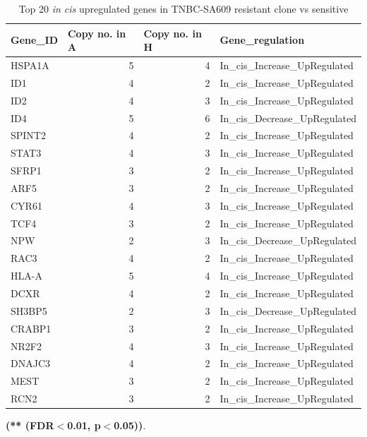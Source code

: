  \begin{table}[htbp]
   \centering
   \caption{Top 20 \textit{in cis} upregulated genes in TNBC-SA609 resistant clone vs sensitive}
     
     \begin{tabular}{|l|r|r|l|}
     \hline
     \textbf{Gene\_ID} & \multicolumn{1}{|l|}{ \textbf{Copy no. in A}}& \multicolumn{1}{|l|}{ \textbf{Copy no. in H}} &  \textbf{Gene\_regulation} \\
     \hline
     HSPA1A & 5 & 4 & In\_cis\_Increase\_UpRegulated \\
     ID1 & 4 & 2 & In\_cis\_Increase\_UpRegulated \\
     ID2 & 4 & 3 & In\_cis\_Increase\_UpRegulated \\
     ID4 & 5 & 6 & In\_cis\_Decrease\_UpRegulated \\
     SPINT2 & 4 & 2 & In\_cis\_Increase\_UpRegulated \\
     STAT3 & 4 & 3 & In\_cis\_Increase\_UpRegulated \\
     SFRP1 & 3 & 2 & In\_cis\_Increase\_UpRegulated \\
     ARF5 & 3 & 2 & In\_cis\_Increase\_UpRegulated \\
     CYR61 & 4 & 3 & In\_cis\_Increase\_UpRegulated \\
     TCF4 & 3 & 2 & In\_cis\_Increase\_UpRegulated \\
     NPW & 2 & 3 & In\_cis\_Decrease\_UpRegulated \\
     RAC3 & 4 & 2 & In\_cis\_Increase\_UpRegulated \\
     HLA-A & 5 & 4 & In\_cis\_Increase\_UpRegulated \\
     DCXR & 4 & 2 & In\_cis\_Increase\_UpRegulated \\
     SH3BP5 & 2 & 3 & In\_cis\_Decrease\_UpRegulated \\
     CRABP1 & 3 & 2 & In\_cis\_Increase\_UpRegulated \\
     NR2F2 & 4 & 3 & In\_cis\_Increase\_UpRegulated \\
     DNAJC3 & 4 & 2 & In\_cis\_Increase\_UpRegulated \\
     MEST & 3 & 2 & In\_cis\_Increase\_UpRegulated \\
     RCN2 & 3 & 2 & In\_cis\_Increase\_UpRegulated \\
     
    \hline
     \end{tabular}%
  
   \label{tab:top20SA609upregulated}%
   
    \small\textbf{(** (FDR$<$0.01, p$<$0.05))}.
 \end{table}%

